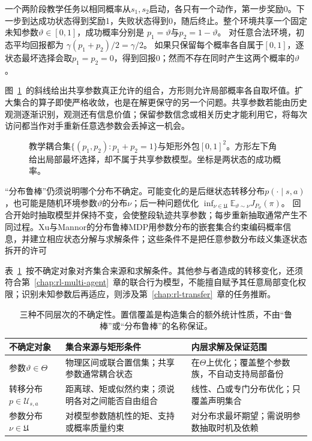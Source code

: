 \begin{example}[共享参数不能随状态独立取坏值]
  \label{ex:rl-trustworthy-coupling}
  一个两阶段教学任务以相同概率从$s_1,s_2$启动，各只有一个动作，第一步奖励0。下一步到达成功状态得到奖励1，失败状态得到0，随后终止。整个环境共享一个固定未知参数$\vartheta\in[0,1]$，成功概率分别是
  $p_1=\vartheta$与$p_2=1-\vartheta$。
  对任意合法环境，初态平均回报都为
  $\gamma(p_1+p_2)/2=\gamma/2$。
  如果只保留每个概率各自属于$[0,1]$，逐状态最坏选择会取$p_1=p_2=0$，得到回报0；然而不存在同时产生这两个概率的$\vartheta$。
\end{example}

图~\ref{fig:rl-trustworthy-rectangular}~的斜线给出共享参数真正允许的组合，方形则允许局部概率各自取坏值。扩大集合的算子即使严格收敛，也是在解更保守的另一个问题。共享参数若能由历史观测逐渐识别，观测还有信息价值；保留参数信念或相关历史才能利用它，将每次访问都当作对手重新任意选参数会丢掉这一机会。

\begin{figure}[htbp]
  \centering
  
  \caption{教学耦合集$\{(p_1,p_2):p_1+p_2=1\}$与矩形外包$[0,1]^2$。方形左下角给出局部最坏选择，却不属于共享参数模型。坐标是两状态的成功概率。}
  \label{fig:rl-trustworthy-rectangular}
\end{figure}

“分布鲁棒”仍须说明哪个分布不确定。可能变化的是后继状态转移分布$p(\cdot\mid s,a)$，也可能是随机环境参数$\vartheta$的分布$\nu$；后一种问题优化
$\inf_{\nu\in\mathfrak U}\mathbb E_{\vartheta\sim\nu}J_{P_\vartheta}(\pi)$。
回合开始时抽取模型并保持不变，会使整段轨迹共享参数；每步重新抽取通常产生不同过程。Xu与Mannor的分布鲁棒MDP用参数分布的嵌套集合约束编码概率信息，并建立相应状态分解与求解条件；这些条件不是把任意参数分布歧义集逐状态拆开的许可

表~\ref{tab:rl-trustworthy-uncertainty}~按不确定对象对齐集合来源和求解条件。其他参与者造成的转移变化，还须符合第~\ref{chap:rl-multi-agent}~章的联合行为模型，不能擅自赋予其任意局部变化权限；识别未知参数后再适应，则涉及第~\ref{chap:rl-transfer}~章的任务推断。

\begin{table}[htbp]
  \centering
  \begin{tabularx}{\linewidth}{@{}>{\raggedright\arraybackslash}p{20mm}XX@{}}
    \toprule
    不确定对象 & 集合来源与矩形条件 & 内层求解及保证范围 \\
    \midrule
    参数$\vartheta\in\Theta$ & 物理区间或联合置信集；共享参数通常耦合状态 & 在$\Theta$上优化；覆盖整个参数族，不自动支持局部备份 \\
    转移分布$p\in\mathcal U_{s,a}$ & 距离球、矩或似然约束；须说明各对之间能否自由组合 & 线性、凸或专门分布优化；只覆盖声明集合 \\
    参数分布$\nu\in\mathfrak U$ & 对模型参数随机性的矩、支持或概率质量约束 & 对分布求最坏期望；需说明参数抽取时机及依赖 \\
    \bottomrule
  \end{tabularx}
  \caption{三种不同层次的不确定性。置信覆盖是构造集合的额外统计性质，不由“鲁棒”或“分布鲁棒”的名称保证。}
  \label{tab:rl-trustworthy-uncertainty}
\end{table}

